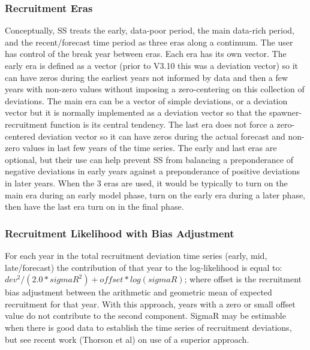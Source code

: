 \subsubsection{Recruitment Eras}
Conceptually, SS treats the early, data-poor period, the main data-rich period, and the recent/forecast time period as three eras along a continuum.  The user has control of the break year between eras.  Each era has its own vector.  The early era is defined as a vector (prior to V3.10 this was a deviation vector) so it can have zeros during the earliest years not informed by data and then a few years with non-zero values without imposing a zero-centering on this collection of deviations.  The main era can be a vector of simple deviations, or a deviation vector but it is normally implemented as a deviation vector so that the spawner-recruitment function is its central tendency.  The last era does not force a zero-centered deviation vector so it can have zeros during the actual forecast and non-zero values in last few years of the time series.  The early and last eras are optional, but their use can help prevent SS from balancing a preponderance of negative deviations in early years against a preponderance of positive deviations in later years.  When the 3 eras are used, it would be typically to turn on the main era during an early model phase, turn on the early era during a later phase, then have the last era turn on in the final phase.

\hypertarget{RecBias}{}
\subsubsection{Recruitment Likelihood with Bias Adjustment}
For each year in the total recruitment deviation time series (early, mid, late/forecast) the contribution of that year to the log-likelihood is equal to:  $dev^2/(2.0*sigmaR^2)+offset*log(sigmaR)$; where offset is the recruitment bias adjustment between the arithmetic and geometric mean of expected recruitment for that year.  With this approach, years with a zero or small offset value do not contribute to the second component. SigmaR may be estimable when there is good data to establish the time series of recruitment deviations, but see recent work (Thorson et al) on use of a superior approach.

